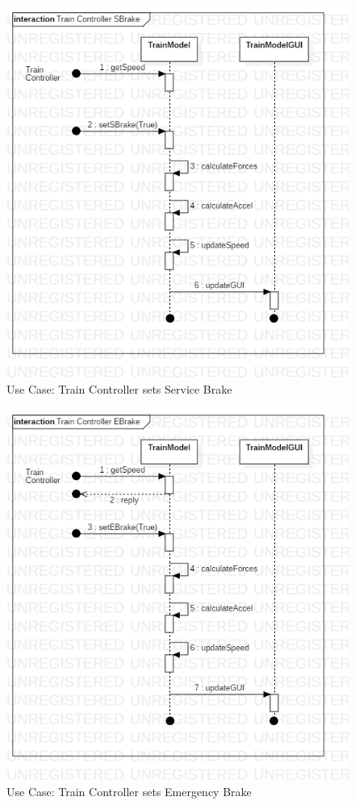 \documentclass{article}
\begin{document}
    \begin{figure}[H]
        \centering
        \includegraphics[width=\textwidth]{./TrainModel/SBrake.png}
        \caption{Use Case: Train Controller sets Service Brake}
        \label{fig:Train Model Service Brake}
    \end{figure}
    \begin{figure}[H]
        \centering
        \includegraphics[width=\textwidth]{./TrainModel/EBrake.png}
        \caption{Use Case: Train Controller sets Emergency Brake}
        \label{fig:Train Model Emergency Brake}
    \end{figure}
\end{document}

